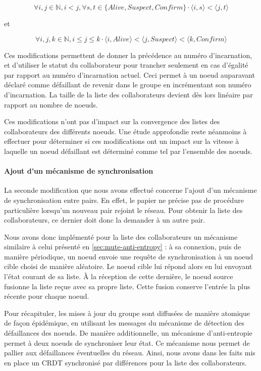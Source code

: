 \documentclass[12pt]{thesul}
\newcommand{\trm}[1]{\mathit{#1}}
\begin{document}
\[\forall i,j \in \mathbb{N}, i < j, \forall s,t \in \{\trm{Alive}, \trm{Suspect}, \trm{Confirm}\} \cdot \langle i,s \rangle < \langle j,t \rangle\]

et

\[\forall i,j,k \in \mathbb{N}, i \leq j \leq k \cdot \langle i,\trm{Alive} \rangle < \langle j,\trm{Suspect} \rangle < \langle k,\trm{Confirm} \rangle\]

Ces modifications permettent de donner la précédence au numéro d'incarnation, et d'utiliser le statut du collaborateur pour trancher seulement en cas d'égalité par rapport au numéro d'incarnation actuel.
Ceci permet à un noeud auparavant déclaré comme défaillant de revenir dans le groupe en incrémentant son numéro d'incarnation.
La taille de la liste des collaborateurs devient dès lors linéaire par rapport au nombre de noeuds.

Ces modifications n'ont pas d'impact sur la convergence des listes des collaborateurs des différents noeuds.
Une étude approfondie reste néanmoins à effectuer pour déterminer si ces modifications ont un impact sur la vitesse à laquelle un noeud défaillant est déterminé comme tel par l'ensemble des noeuds.

\paragraph{Ajout d'un mécanisme de synchronisation}

La seconde modification que nous avons effectué concerne l'ajout d'un mécanisme de synchronisation entre pairs.
En effet, le papier ne précise pas de procédure particulière lorsqu'un nouveau pair rejoint le réseau.
Pour obtenir la liste des collaborateurs, ce dernier doit donc la demander à un autre pair.

Nous avons donc implémenté pour la liste des collaborateurs un mécanisme similaire à celui présenté en \autoref{sec:mute-anti-entropy} : à sa connexion, puis de manière périodique, un noeud envoie une requête de synchronisation à un noeud cible choisi de manière aléatoire.
Le noeud cible lui répond alors en lui envoyant l'état courant de sa liste.
À la réception de cette dernière, le noeud source fusionne la liste reçue avec sa propre liste.
Cette fusion conserve l'entrée la plus récente pour chaque noeud.

Pour récapituler, les mises à jour du groupe sont diffusées de manière atomique de façon épidémique, en utilisant les messages du mécanisme de détection des défaillances des noeuds.
De manière additionnelle, un mécanisme d'anti-entropie permet à deux noeuds de synchroniser leur état.
Ce mécanisme nous permet de pallier aux défaillances éventuelles du réseau.
Ainsi, nous avons dans les faits mis en place un \ac{CRDT} synchronisé par différences pour la liste des collaborateurs.
\end{document}
